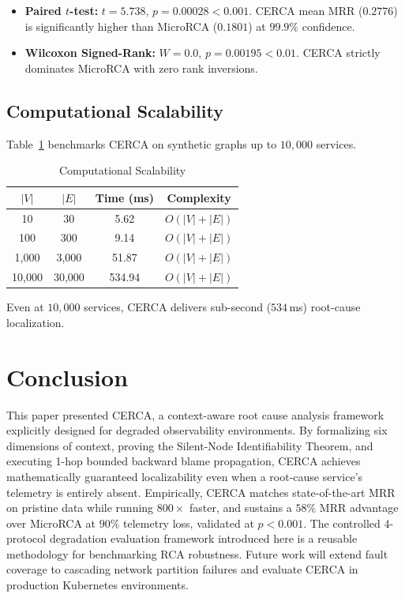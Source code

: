 \documentclass[conference]{IEEEtran}
\begin{document}
\begin{itemize}
    \item \textbf{Paired $t$-test:} $t = 5.738$, $p = 0.00028 < 0.001$. CERCA mean MRR ($0.2776$) is significantly higher than MicroRCA ($0.1801$) at $99.9\%$ confidence.
    \item \textbf{Wilcoxon Signed-Rank:} $W = 0.0$, $p = 0.00195 < 0.01$. CERCA strictly dominates MicroRCA with zero rank inversions.
\end{itemize}

\subsection{Computational Scalability}

Table~\ref{tab:scalability} benchmarks CERCA on synthetic graphs up to $10{,}000$ services.

\begin{table}[htbp]
\caption{Computational Scalability}
\label{tab:scalability}
\begin{tabular}{cccc}
\toprule
\textbf{$|V|$} & \textbf{$|E|$} & \textbf{Time (ms)} & \textbf{Complexity} \\
\midrule
10 & 30 & 5.62 & $O(|V|+|E|)$ \\
100 & 300 & 9.14 & $O(|V|+|E|)$ \\
1,000 & 3,000 & 51.87 & $O(|V|+|E|)$ \\
10,000 & 30,000 & 534.94 & $O(|V|+|E|)$ \\
\bottomrule
\end{tabular}
\end{table}

Even at $10{,}000$ services, CERCA delivers sub-second ($534$\,ms) root-cause localization.

\section{Conclusion}

This paper presented CERCA, a context-aware root cause analysis framework explicitly designed for degraded observability environments. By formalizing six dimensions of context, proving the Silent-Node Identifiability Theorem, and executing 1-hop bounded backward blame propagation, CERCA achieves mathematically guaranteed localizability even when a root-cause service's telemetry is entirely absent. Empirically, CERCA matches state-of-the-art MRR on pristine data while running $800\times$ faster, and sustains a $58\%$ MRR advantage over MicroRCA at $90\%$ telemetry loss, validated at $p < 0.001$. The controlled 4-protocol degradation evaluation framework introduced here is a reusable methodology for benchmarking RCA robustness. Future work will extend fault coverage to cascading network partition failures and evaluate CERCA in production Kubernetes environments.
\end{document}

